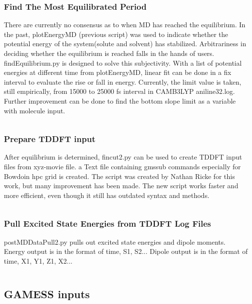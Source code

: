 \documentclass[
journal=jpcbfk, %
manuscript=article]{achemso}
\begin{document}
		\subsubsection{Find The Most Equilibrated Period}
			There are currently no consensus as to when MD has reached the equilibrium. In the past, plotEnergyMD (previous script) was used to indicate whether the potential energy of the system(solute and solvent) has stabilized. Arbitrariness in deciding whether the equilibrium is reached falls in the hands of users. findEquilibrium.py is designed to solve this subjectivity. With a list of potential energies at different time from plotEnergyMD, linear fit can be done in a fix interval to evaluate the rise or fall in energy. Currently, the limit value is taken, still empirically, from 15000 to 25000 fs interval in CAMB3LYP aniline32.log. Further improvement can be done to find the bottom slope limit as a variable with molecule input.
			\inputminted[linenos, breaklines, baselinestretch=1, fontsize=\small]{python}{../pythonScripts/findEquilibrium.py} 
		
		\subsubsection{Prepare TDDFT input}
			After equilibrium is determined, fincut2.py can be used to create TDDFT input files from xyz-movie file. a Text file containing gmssub commands especially for Bowdoin hpc grid is created. The script was created by Nathan Ricke for this work, but many improvement has been made. The new script works faster and more efficient, even though it still has outdated syntax and methods.
			\inputminted[linenos, breaklines, baselinestretch=1, fontsize=\small]{python}{../pythonScripts/fincut2.py} 
		
		\subsubsection{Pull Excited State Energies from TDDFT Log Files}
			postMDDataPull2.py pulls out excited state energies and dipole moments. Energy output is in the format of time, S1, S2... Dipole output is in the format of time, X1, Y1, Z1, X2...
			\inputminted[linenos, breaklines, baselinestretch=1, fontsize=\small]{python}{../pythonScripts/postMDDataPull2.py} 
		
	\subsection{GAMESS inputs}
\end{document}
